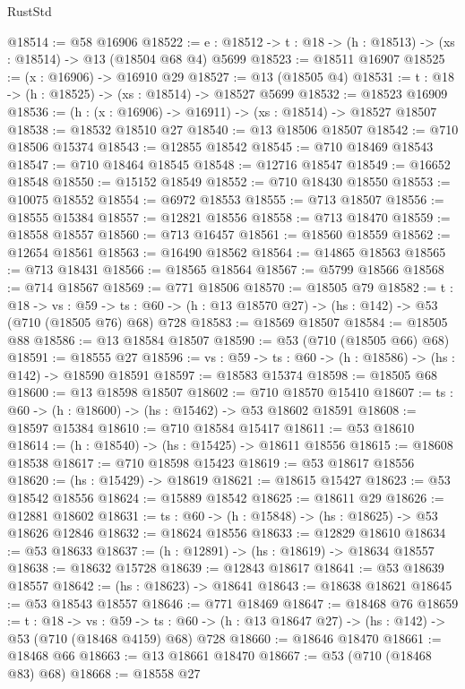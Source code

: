 \begin{lexlean}{RustStd}
\begin{coremodule}
@18514 := @58 @16906
@18522 := {e : @18512} -> {t : @18} -> (h : @18513) -> (xs : @18514) -> @13 (@18504 @68 @4) @5699
@18523 := @18511 @16907
@18525 := (x : @16906) -> @16910 @29
@18527 := @13 (@18505 @4)
@18531 := {t : @18} -> (h : @18525) -> (xs : @18514) -> @18527 @5699
@18532 := @18523 @16909
@18536 := (h : (x : @16906) -> @16911) -> (xs : @18514) -> @18527 @18507
@18538 := @18532 @18510 @27
@18540 := @13 @18506 @18507
@18542 := @710 @18506 @15374
@18543 := @12855 @18542
@18545 := @710 @18469 @18543
@18547 := @710 @18464 @18545
@18548 := @12716 @18547
@18549 := @16652 @18548
@18550 := @15152 @18549
@18552 := @710 @18430 @18550
@18553 := @10075 @18552
@18554 := @6972 @18553
@18555 := @713 @18507
@18556 := @18555 @15384
@18557 := @12821 @18556
@18558 := @713 @18470
@18559 := @18558 @18557
@18560 := @713 @16457
@18561 := @18560 @18559
@18562 := @12654 @18561
@18563 := @16490 @18562
@18564 := @14865 @18563
@18565 := @713 @18431
@18566 := @18565 @18564
@18567 := @5799 @18566
@18568 := @714 @18567
@18569 := @771 @18506
@18570 := @18505 @79
@18582 := {t : @18} ->
  {vs : @59} ->
  {ts : @60} -> (h : @13 @18570 @27) -> (hs : @142) -> @53 (@710 (@18505 @76) @68) @728
@18583 := @18569 @18507
@18584 := @18505 @88
@18586 := @13 @18584 @18507
@18590 := @53 (@710 (@18505 @66) @68)
@18591 := @18555 @27
@18596 := {vs : @59} -> {ts : @60} -> (h : @18586) -> (hs : @142) -> @18590 @18591
@18597 := @18583 @15374
@18598 := @18505 @68
@18600 := @13 @18598 @18507
@18602 := @710 @18570 @15410
@18607 := {ts : @60} -> (h : @18600) -> (hs : @15462) -> @53 @18602 @18591
@18608 := @18597 @15384
@18610 := @710 @18584 @15417
@18611 := @53 @18610
@18614 := (h : @18540) -> (hs : @15425) -> @18611 @18556
@18615 := @18608 @18538
@18617 := @710 @18598 @15423
@18619 := @53 @18617 @18556
@18620 := (hs : @15429) -> @18619
@18621 := @18615 @15427
@18623 := @53 @18542 @18556
@18624 := @15889 @18542
@18625 := @18611 @29
@18626 := @12881 @18602
@18631 := {ts : @60} -> (h : @15848) -> (hs : @18625) -> @53 @18626 @12846
@18632 := @18624 @18556
@18633 := @12829 @18610
@18634 := @53 @18633
@18637 := (h : @12891) -> (hs : @18619) -> @18634 @18557
@18638 := @18632 @15728
@18639 := @12843 @18617
@18641 := @53 @18639 @18557
@18642 := (hs : @18623) -> @18641
@18643 := @18638 @18621
@18645 := @53 @18543 @18557
@18646 := @771 @18469
@18647 := @18468 @76
@18659 := {t : @18} ->
  {vs : @59} ->
  {ts : @60} -> (h : @13 @18647 @27) -> (hs : @142) -> @53 (@710 (@18468 @4159) @68) @728
@18660 := @18646 @18470
@18661 := @18468 @66
@18663 := @13 @18661 @18470
@18667 := @53 (@710 (@18468 @83) @68)
@18668 := @18558 @27

\end{coremodule}
\end{lexlean}
